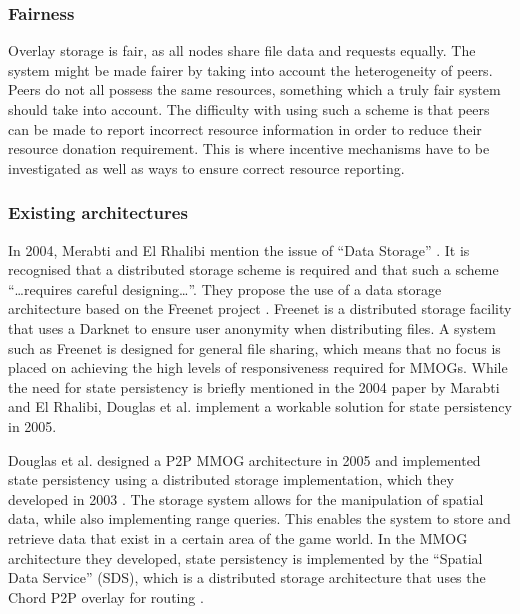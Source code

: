 \documentclass[10pt,a4paper,journal,cspaper,compsoc]{IEEEtran}
\begin{document}
\subsubsection{Fairness}

Overlay storage is fair, as all nodes share file data and requests equally. The system might be made fairer by taking into account the heterogeneity
of peers. Peers do not all possess the same resources, something which a truly fair system should take into account. The difficulty with using such a
scheme is that peers can be made to report incorrect resource information in order to reduce their resource donation requirement. This is where
incentive mechanisms have to be investigated as well as ways to ensure correct resource reporting.

\subsubsection{Existing architectures}

In 2004, Merabti and El Rhalibi mention the issue of ``Data Storage'' \cite{using_freenet_storage}. It is recognised that a distributed storage
scheme is required and that such a scheme ``\ldots requires careful designing\ldots''. They propose the use of a data storage architecture based on
the Freenet project \cite{clarke_freenet}. Freenet is a distributed storage facility that uses a Darknet to ensure user anonymity when distributing
files. A system such as Freenet is designed for general file sharing, which means that no focus is placed on achieving the high levels of
responsiveness required for MMOGs. While the need for state persistency is briefly mentioned in the 2004 paper by Marabti and El Rhalibi, Douglas et
al. implement a workable solution for state persistency in 2005.

Douglas et al. designed a P2P MMOG architecture in 2005 \cite{Douglas05enablingmassively} and implemented state persistency using a distributed
storage implementation, which they developed in 2003 \cite{Harwood03hashingspatial}. The storage system allows for the manipulation of spatial data,
while also implementing range queries. This enables the system to store and retrieve data that exist in a certain area of the game world. In the MMOG
architecture they developed, state persistency is implemented by the ``Spatial Data Service'' (SDS), which is a distributed storage architecture that
uses the Chord P2P overlay for routing \cite{chord}.
\end{document}
